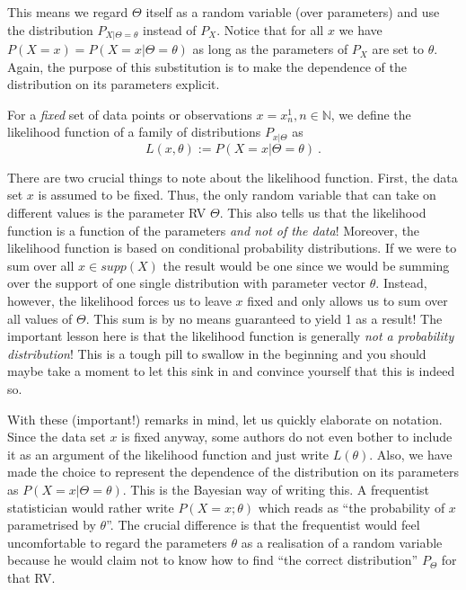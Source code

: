 This means we regard $ \Theta $ itself as a random variable (over parameters) and use the distribution $ P_{X|\Theta=\theta} $ instead of $ P_{X} $. Notice that for all
$ x $ we have $ P(X=x) = P(X=x|\Theta = \theta) $ as long as the parameters of $ P_{X} $ are set to $ \theta $. Again, the purpose of this substitution is to make
the dependence of the distribution on its parameters explicit.

\begin{Definition}
For a \emph{fixed} set of data points or observations $ x = x^{1}_{n}, n \in \mathbb{N} $, we define the likelihood function of a 
family of distributions $ P_{x|\Theta} $ as $$ L(x,\theta) := P(X=x|\Theta = \theta) \ . $$
\end{Definition}

There are two crucial things to note about the likelihood function. First, the data set $ x $ is assumed to be fixed. Thus, the only random variable that can take
on different values is the parameter RV $ \Theta $. This also tells us that the likelihood function is a function of the parameters \emph{and not of the data}!
Moreover, the likelihood function is based on conditional probability distributions. If we were to sum over all $ x \in supp(X) $ the result would be one since 
we would be summing over the support of one single distribution with parameter vector $ \theta $. Instead, however, the likelihood forces us to leave $ x $ fixed and
only allows us to sum over all values of $ \Theta $. This sum is by no means guaranteed to yield 1 as a result! The important lesson here is that the likelihood 
function is generally \emph{not a probability distribution}! This is a tough pill to swallow in the beginning and you should maybe take a moment to let this sink in
and convince yourself that this is indeed so.

With these (important!) remarks in mind, let us quickly elaborate on notation. Since the data set $ x $ is fixed anyway, some authors do not even bother to include
it as an argument of the likelihood function and just write $ L(\theta) $. Also, we have made the choice to represent the dependence of the distribution on its
parameters as $ P(X=x|\Theta=\theta) $. This is the Bayesian way of writing this. A frequentist statistician would rather write $ P(X=x; \theta) $ which reads as
``the probability of $ x $ parametrised by $ \theta $''. The crucial difference is that the frequentist would feel uncomfortable to regard the parameters $ \theta $
as a realisation of a random variable because he would claim not to know how to find ``the correct distribution'' $ P_{\Theta} $ for that RV.


